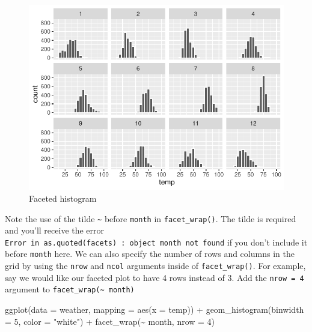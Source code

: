 \documentclass[
  letterpaper,
  DIV=11,
  numbers=noendperiod]{scrreprt}
\newenvironment{Shaded}{\begin{snugshade}}{\end{snugshade}}
\newcommand{\AttributeTok}[1]{\textcolor[rgb]{0.40,0.45,0.13}{#1}}
\newcommand{\DecValTok}[1]{\textcolor[rgb]{0.68,0.00,0.00}{#1}}
\newcommand{\FunctionTok}[1]{\textcolor[rgb]{0.28,0.35,0.67}{#1}}
\newcommand{\NormalTok}[1]{\textcolor[rgb]{0.00,0.23,0.31}{#1}}
\newcommand{\SpecialCharTok}[1]{\textcolor[rgb]{0.37,0.37,0.37}{#1}}
\newcommand{\StringTok}[1]{\textcolor[rgb]{0.13,0.47,0.30}{#1}}
\theoremstyle{definition}
\theoremstyle{remark}
\begin{document}
\begin{figure}[H]

{\centering \includegraphics{02-visualization_files/figure-pdf/fig-facethistogram-1.pdf}

}

\caption{\label{fig-facethistogram}Faceted histogram}

\end{figure}

Note the use of the tilde \texttt{\textasciitilde{}} before
\texttt{month} in \texttt{facet\_wrap()}. The tilde is required and
you'll receive the error
\texttt{Error\ in\ as.quoted(facets)\ :\ object\ \textquotesingle{}month\textquotesingle{}\ not\ found}
if you don't include it before \texttt{month} here. We can also specify
the number of rows and columns in the grid by using the \texttt{nrow}
and \texttt{ncol} arguments inside of \texttt{facet\_wrap()}. For
example, say we would like our faceted plot to have 4 rows instead of 3.
Add the \texttt{nrow\ =\ 4} argument to
\texttt{facet\_wrap(\textasciitilde{}\ month)}

\begin{Shaded}
\begin{Highlighting}[]
\FunctionTok{ggplot}\NormalTok{(}\AttributeTok{data =}\NormalTok{ weather, }\AttributeTok{mapping =} \FunctionTok{aes}\NormalTok{(}\AttributeTok{x =}\NormalTok{ temp)) }\SpecialCharTok{+}
  \FunctionTok{geom\_histogram}\NormalTok{(}\AttributeTok{binwidth =} \DecValTok{5}\NormalTok{, }\AttributeTok{color =} \StringTok{"white"}\NormalTok{) }\SpecialCharTok{+}
  \FunctionTok{facet\_wrap}\NormalTok{(}\SpecialCharTok{\textasciitilde{}}\NormalTok{ month, }\AttributeTok{nrow =} \DecValTok{4}\NormalTok{)}
\end{Highlighting}
\end{Shaded}
\end{document}
